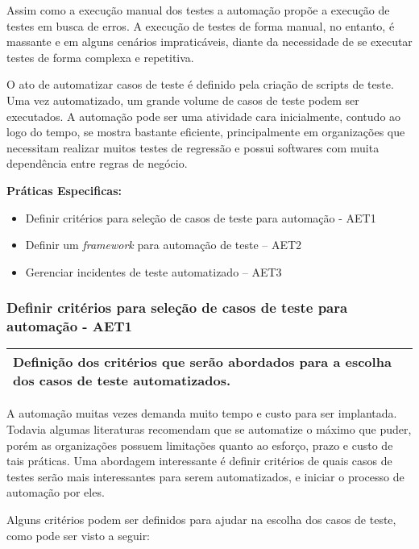 Assim como a execução manual dos testes a automação propõe a execução de testes em busca de erros. A execução de testes de forma manual, no entanto, é massante e em alguns cenários impraticáveis, diante da necessidade de se executar testes de forma complexa e repetitiva.

O ato de automatizar casos de teste é definido pela criação de scripts de teste. Uma vez automatizado, um grande volume de casos de teste podem ser executados. A automação pode ser uma atividade cara inicialmente, contudo ao logo do tempo, se mostra bastante eficiente, principalmente em organizações que necessitam realizar muitos testes de regressão e possui softwares com muita dependência entre regras de negócio.

\textbf{Práticas Especificas:}
\begin{itemize}
    \item Definir critérios para seleção de casos de teste para automação - AET1
    \item Definir um \textit{framework} para automação de teste – AET2
    \item Gerenciar incidentes de teste automatizado – AET3
\end{itemize}

\subsubsection{Definir critérios para seleção de casos de teste para automação - AET1}
\label{sec:aet1}

\begin{table}[!ht]
\centering
\begin{tabular}{|p{130mm}|}
\hline
Definição dos critérios que serão abordados para a escolha dos casos de teste automatizados. \\ 
\hline
\end{tabular}
\end{table}

A automação muitas vezes demanda muito tempo e custo para ser implantada. Todavia algumas literaturas recomendam que se automatize o máximo que puder, porém as organizações possuem limitações quanto ao esforço, prazo e custo de tais práticas. Uma abordagem interessante é definir critérios de quais casos de testes serão mais interessantes para serem automatizados, e iniciar o processo de automação por eles.

Alguns critérios podem ser definidos para ajudar na escolha dos casos de teste, como pode ser visto a seguir:

